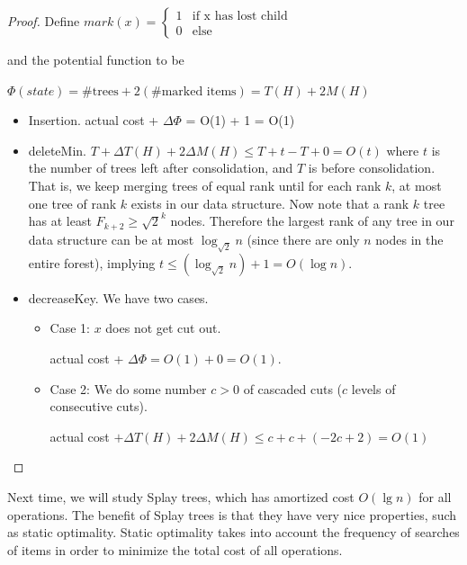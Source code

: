 \documentclass[11pt]{article}
\begin{document}
\begin{proof}
Define $mark(x) = \begin{cases} 1& \mbox{if x has lost child} \\
 0 & \mbox{else}
  \end{cases}
 $ 
 
 and the potential function to be 

$\Phi(state) = \mbox{\# trees} + 2 (\mbox{\# marked items}) = T(H) + 2 M(H)$

\begin{itemize}

\item Insertion. actual cost + $\Delta \Phi$ = O(1) + 1 = O(1)

\item deleteMin. $T + \Delta T(H) + 2\Delta M(H) \leq T + t- T + 0 = O(t)$ where $t$ is the number of trees left after consolidation, and $T$ is before consolidation. That is, we keep merging trees of equal rank until for each rank $k$, at most one tree of rank $k$ exists in our data structure. Now note that a rank $k$ tree has at least $F_{k+2} \ge \sqrt{2}^k$ nodes. Therefore the largest rank of any tree in our data structure can be at most $\log_{\sqrt{2}} n$ (since there are only $n$ nodes in the entire forest), implying $t \le (\log_{\sqrt{2}} n) + 1 = O(\log n)$.

\item decreaseKey. We have two cases.
\begin{itemize} 
\item Case 1: $x$ does not get cut out.

actual cost + $\Delta \Phi = O(1) + 0 = O(1)$.

\item Case 2: We do some number $c > 0$ of cascaded cuts ($c$ levels of consecutive cuts). 

actual cost $+ \Delta T(H) + 2 \Delta M(H) \leq 
           c     +             c          +  ( - 2c + 2) = O(1)$
\end{itemize}
\end{itemize}

\end{proof}


Next time, we will study Splay trees, which has amortized cost $O(\lg n)$ for all operations. The benefit of Splay trees is that they have very nice properties, such as static optimality. Static optimality takes into account the frequency of searches of items in order to minimize the total cost of all operations.
\end{document}
